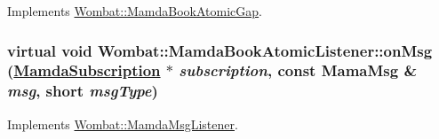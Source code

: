 Implements \hyperlink{classWombat_1_1MamdaBookAtomicGap_54152f40fa9bc51cb2b67d3b64a911c3}{Wombat::Mamda\-Book\-Atomic\-Gap}.\hypertarget{classWombat_1_1MamdaBookAtomicListener_f8e8325226362f8accab387ebcfe4c68}{
\subsubsection[onMsg]{\setlength{\rightskip}{0pt plus 5cm}virtual void Wombat::Mamda\-Book\-Atomic\-Listener::on\-Msg (\hyperlink{classWombat_1_1MamdaSubscription}{Mamda\-Subscription} $\ast$ {\em subscription}, const Mama\-Msg \& {\em msg}, short {\em msg\-Type})}}
\label{classWombat_1_1MamdaBookAtomicListener_f8e8325226362f8accab387ebcfe4c68}




Implements \hyperlink{classWombat_1_1MamdaMsgListener_c700829ebcce095b95b8b67b39a1c67d}{Wombat::Mamda\-Msg\-Listener}.